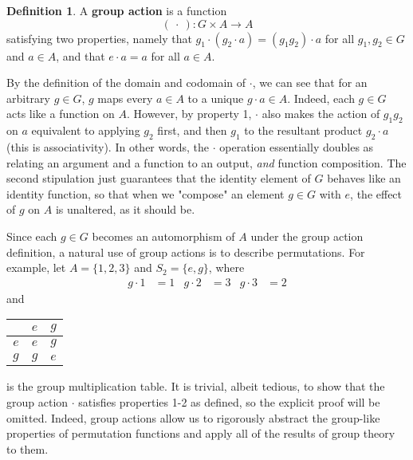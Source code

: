 \documentclass[openany, amssymb, psamsfonts]{amsart}
\theoremstyle{definition}
\newtheorem{defn}{Definition}[section]
\numberwithin{equation}{section}
\begin{document}
\begin{defn}
    A \textbf{group action} is a function
    \begin{equation*}
        (\ \cdot\ ):G\times A\to A
    \end{equation*}
    satisfying two properties, namely that $g_1\cdot(g_2\cdot a)=(g_1g_2)\cdot a$ for all $g_1,g_2\in G$ and $a\in A$, and that $e\cdot a=a$ for all $a\in A$.
\end{defn}
By the definition of the domain and codomain of $\cdot$, we can see that for an arbitrary $g\in G$, $g$ maps every $a\in A$ to a unique $g\cdot a\in A$. Indeed, each $g\in G$ acts like a function on $A$. However, by property 1, $\cdot$ also makes the action of $g_1g_2$ on $a$ equivalent to applying $g_2$ first, and then $g_1$ to the resultant product $g_2\cdot a$ (this is associativity). In other words, the $\cdot$ operation essentially doubles as relating an argument and a function to an output, \emph{and} function composition. The second stipulation just guarantees that the identity element of $G$ behaves like an identity function, so that when we "compose" an element $g\in G$ with $e$, the effect of $g$ on $A$ is unaltered, as it should be.\par
Since each $g\in G$ becomes an automorphism of $A$ under the group action definition, a natural use of group actions is to describe permutations. For example, let $A=\{1,2,3\}$ and $S_2=\{e,g\}$, where
\begin{align*}
    g\cdot 1 &= 1&
    g\cdot 2 &= 3&
    g\cdot 3 &= 2
\end{align*}
and
\begin{center}
    \begin{tabular}{r|cc}
            & $e$ & $g$\\
        \hline
        $e$ & $e$ & $g$\\
        $g$ & $g$ & $e$\\
    \end{tabular}
\end{center}
is the group multiplication table. It is trivial, albeit tedious, to show that the group action $\cdot$ satisfies properties 1-2 as defined, so the explicit proof will be omitted. Indeed, group actions allow us to rigorously abstract the group-like properties of permutation functions and apply all of the results of group theory to them.
\end{document}
